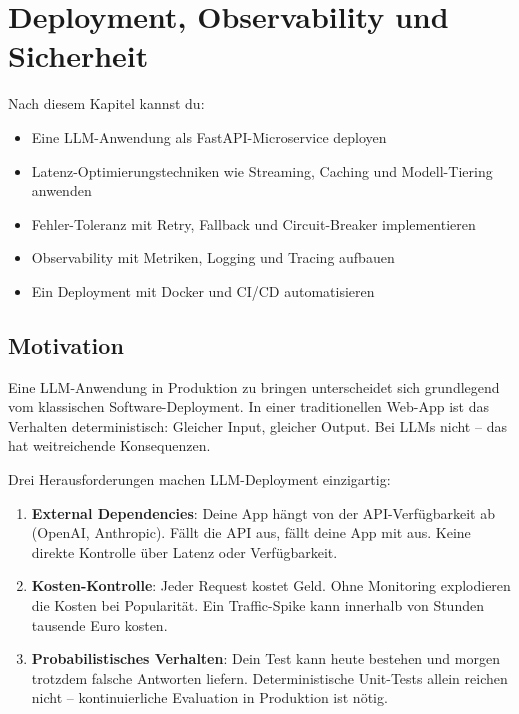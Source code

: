 \chapter{Deployment, Observability und Sicherheit}

\label{chap:deployment_observability}

\begin{lernziele}
Nach diesem Kapitel kannst du:
\begin{itemize}
    \item Eine LLM-Anwendung als FastAPI-Microservice deployen
    \item Latenz-Optimierungstechniken wie Streaming, Caching und Modell-Tiering anwenden
    \item Fehler-Toleranz mit Retry, Fallback und Circuit-Breaker implementieren
    \item Observability mit Metriken, Logging und Tracing aufbauen
    \item Ein Deployment mit Docker und CI/CD automatisieren
\end{itemize}
\end{lernziele}

\section{Motivation}

Eine LLM-Anwendung in Produktion zu bringen unterscheidet sich grundlegend vom klassischen Software-Deployment. In einer traditionellen Web-App ist das Verhalten deterministisch: Gleicher Input, gleicher Output. Bei LLMs nicht -- das hat weitreichende Konsequenzen.

Drei Herausforderungen machen LLM-Deployment einzigartig:

\begin{enumerate}[leftmargin=*]
    \item \textbf{External Dependencies}: Deine App hängt von der API-Verfügbarkeit ab (OpenAI, Anthropic). Fällt die API aus, fällt deine App mit aus. Keine direkte Kontrolle über Latenz oder Verfügbarkeit.
    \item \textbf{Kosten-Kontrolle}: Jeder Request kostet Geld. Ohne Monitoring explodieren die Kosten bei Popularität. Ein Traffic-Spike kann innerhalb von Stunden tausende Euro kosten.
    \item \textbf{Probabilistisches Verhalten}: Dein Test kann heute bestehen und morgen trotzdem falsche Antworten liefern. Deterministische Unit-Tests allein reichen nicht -- kontinuierliche Evaluation in Produktion ist nötig.
\end{enumerate}

